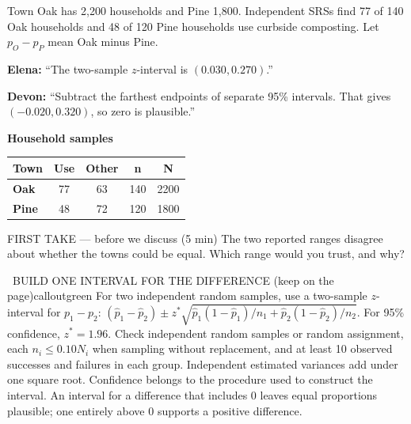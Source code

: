 \documentclass[11pt]{article}
\begin{document}


Town Oak has 2{,}200 households and Pine 1{,}800. Independent SRSs find 77 of 140 Oak households and 48 of 120 Pine households use curbside composting. Let $p_O-p_P$ mean Oak minus Pine.\par\smallskip \textbf{Elena:} ``The two-sample $z$-interval is $(0.030,0.270)$.''\par \textbf{Devon:} ``Subtract the farthest endpoints of separate 95\% intervals. That gives $(-0.020,0.320)$, so zero is plausible.''\par
\begin{center}
\textbf{Household samples}\par\smallskip
\begin{tabular}{|l|c|c|c|c|}
\hline
\textbf{Town} & \textbf{Use} & \textbf{Other} & \textbf{n} & \textbf{N} \\ \hline
\textbf{Oak} & 77 & 63 & 140 & 2200 \\ \hline
\textbf{Pine} & 48 & 72 & 120 & 1800 \\ \hline
\end{tabular}
\end{center}
\begin{firsttakebox}{FIRST TAKE --- before we discuss (5 min)}
The two reported ranges disagree about whether the towns could be equal. Which range would you trust, and why?
\workspace{0.9in}
\end{firsttakebox}

\begin{callout}{\IconBook\ BUILD ONE INTERVAL FOR THE DIFFERENCE (keep on the page)}{calloutgreen}
For two independent random samples, use a two-sample $z$-interval for $p_1-p_2$:
$(\hat p_1-\hat p_2)\pm z^*\sqrt{\hat p_1(1-\hat p_1)/n_1+\hat p_2(1-\hat p_2)/n_2}$.
For 95\% confidence, $z^*=1.96$. Check independent random samples or random assignment,
each $n_i\leq0.10N_i$ when sampling without replacement, and at least 10 observed successes and failures in each group.
Independent estimated variances add under one square root. Confidence belongs to the procedure used to construct the interval.
An interval for a difference that includes 0 leaves equal proportions plausible; one entirely above 0 supports a positive difference.
\end{callout}
\end{document}
